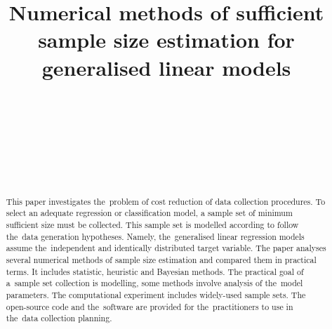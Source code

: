 \documentclass[
11pt,%
tightenlines,%
twoside,%
onecolumn,%
nofloats,%
nobibnotes,%
nofootinbib,%
superscriptaddress,%
noshowpacs,%
centertags]%
{revtex4}
\begin{document}
\title{Numerical methods of sufficient sample size estimation for generalised linear models}
\author{~}
\author{~}
\author{~}
\author{~}
\received{}

\begin{abstract}
This paper investigates the~problem of cost reduction of data collection procedures. To select an adequate regression or classification model, a sample set of minimum sufficient size must be collected. This sample set is modelled according to follow the~data generation hypotheses. Namely, the~generalised linear regression models assume the~independent and identically distributed target variable. The paper analyses several numerical methods of sample size estimation and compared them in practical terms. It includes statistic, heuristic and Bayesian methods. The practical goal of a~sample set collection is modelling, some methods involve analysis of the~model parameters. The computational experiment includes widely-used sample sets. The open-source code and the~software are provided for the~practitioners to use in the~data collection planning.
\end{abstract}

\maketitle
\end{document}
